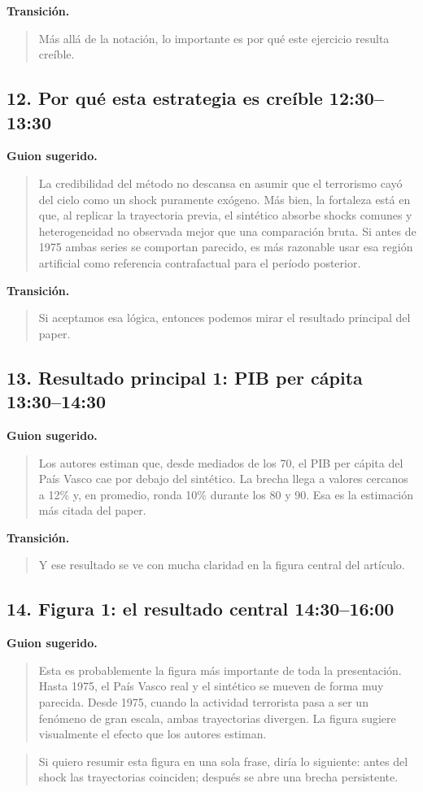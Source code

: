 \documentclass[11pt]{article}
\newcommand{\slideentry}[2]{\subsection*{#1 \hfill #2}}
\begin{document}
\textbf{Transición.}
\begin{quote}
Más allá de la notación, lo importante es por qué este ejercicio resulta creíble.
\end{quote}

\slideentry{12. Por qué esta estrategia es creíble}{12:30--13:30}

\textbf{Guion sugerido.}
\begin{quote}
La credibilidad del método no descansa en asumir que el terrorismo cayó del cielo como un shock puramente exógeno. Más bien, la fortaleza está en que, al replicar la trayectoria previa, el sintético absorbe shocks comunes y heterogeneidad no observada mejor que una comparación bruta. Si antes de 1975 ambas series se comportan parecido, es más razonable usar esa región artificial como referencia contrafactual para el período posterior.
\end{quote}

\textbf{Transición.}
\begin{quote}
Si aceptamos esa lógica, entonces podemos mirar el resultado principal del paper.
\end{quote}

\slideentry{13. Resultado principal 1: PIB per cápita}{13:30--14:30}

\textbf{Guion sugerido.}
\begin{quote}
Los autores estiman que, desde mediados de los 70, el PIB per cápita del País Vasco cae por debajo del sintético. La brecha llega a valores cercanos a 12\% y, en promedio, ronda 10\% durante los 80 y 90. Esa es la estimación más citada del paper.
\end{quote}

\textbf{Transición.}
\begin{quote}
Y ese resultado se ve con mucha claridad en la figura central del artículo.
\end{quote}

\slideentry{14. Figura 1: el resultado central}{14:30--16:00}

\textbf{Guion sugerido.}
\begin{quote}
Esta es probablemente la figura más importante de toda la presentación. Hasta 1975, el País Vasco real y el sintético se mueven de forma muy parecida. Desde 1975, cuando la actividad terrorista pasa a ser un fenómeno de gran escala, ambas trayectorias divergen. La figura sugiere visualmente el efecto que los autores estiman.
\end{quote}

\begin{quote}
Si quiero resumir esta figura en una sola frase, diría lo siguiente: antes del shock las trayectorias coinciden; después se abre una brecha persistente.
\end{quote}
\end{document}
